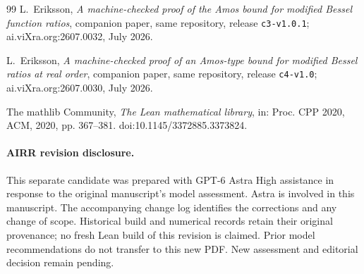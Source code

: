 \documentclass[11pt]{article}
\newcommand{\lean}[1]{\texttt{#1}}
\begin{document}
\begin{thebibliography}{99}
 L.~Eriksson,
\emph{A machine-checked proof of the Amos bound for modified Bessel
function ratios}, companion paper, same repository, release
\lean{c3-v1.0.1}; ai.viXra.org:2607.0032, July 2026.

 L.~Eriksson,
\emph{A machine-checked proof of an Amos-type bound for modified
Bessel ratios at real order}, companion paper, same repository,
release \lean{c4-v1.0}; ai.viXra.org:2607.0030, July 2026.

 The mathlib Community,
\emph{The Lean mathematical library}, in: Proc. CPP 2020, ACM, 2020,
pp. 367--381. doi:10.1145/3372885.3373824.

\end{thebibliography}


\paragraph{AIRR revision disclosure.}
This separate candidate was prepared with GPT-6 Astra High assistance
in response to the original manuscript's model assessment. Astra is
involved in this manuscript. The accompanying change log identifies
the corrections and any change of scope. Historical build and numerical
records retain their original provenance; no fresh Lean build of this
revision is claimed. Prior model recommendations do not transfer to this
new PDF. New assessment and editorial decision remain pending.
\end{document}
